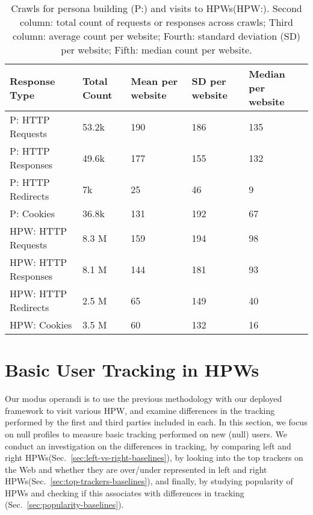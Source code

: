 \documentclass{article}
\newcommand{\hpw}{HPW\xspace}
\newcommand{\hpws}{HPWs\xspace}
\begin{document}
\begin{table}
    \centering
    \caption{Crawls for persona building (P:) and visits to \hpws (HPW:).
        Second column: total count of requests or responses across crawls;
        Third column: average count per website;
        Fourth: standard deviation (SD) per website; Fifth: median count per website.}
    {\small
        \begin{tabular}{p{3.5cm}p{1.5cm}p{2.5cm}p{2cm}p{2.5cm}}
            \toprule
            Response Type			&	Total	Count		&	Mean per website &SD per website&Median per website	\\
            \midrule
            P: HTTP Requests		&	53.2k			&	190 &186 &	135	\\
            P: HTTP Responses		&	49.6k			&	177 &155	&	132	\\
            P: HTTP Redirects		&	7k				&	25 &46	&	9	\\
            P: Cookies			&	36.8k			&	131 &192	&	67	\\
            \midrule
            HPW: HTTP Requests	&	8.3 M			&	159 &194 & 	98	\\
            HPW: HTTP Responses	&	8.1 M			&	144 &181	&	93	\\
            HPW: HTTP Redirects	&	2.5 M			&	65 &149	&	40	\\
            HPW: Cookies			&	3.5 M			&	60 &132	&	16	\\
            \bottomrule
        \end{tabular}
    }
    \label{table:OpenWPM}
\end{table}


\section{Basic User Tracking in HPW\lowercase{s}}\label{sec:results-baselines}

Our modus operandi is to use the previous methodology with our deployed framework to visit various \hpw, and examine differences in the tracking performed by the first and third parties included in each.
In this section, we focus on null profiles to measure basic tracking performed on new (null) users.
We conduct an investigation on the differences in tracking, by comparing left and right \hpws (Sec.~\ref{sec:left-vs-right-baselines}), by looking into the top trackers on the Web and whether they are over/under represented in left and right \hpws (Sec.~\ref{sec:top-trackers-baselines}), and finally, by studying popularity of \hpws and checking if this associates with differences in tracking (Sec.~\ref{sec:popularity-baselines}).
\end{document}
